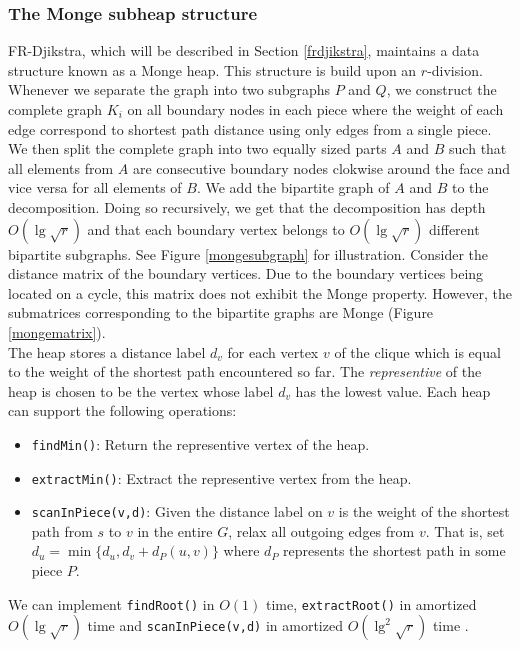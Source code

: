\subsubsection{The Monge subheap structure}\label{mongeheap}
FR-Djikstra, which will be described in Section \ref{frdjikstra}, maintains a data
structure known as a Monge heap. This structure is build upon an $r$-division. Whenever we separate the graph into two
subgraphs $P$ and $Q$, we construct the complete graph $K_i$ on all boundary nodes in
each piece where the weight of each edge correspond to shortest path distance using
only edges from a single piece. We then split the complete graph into two equally
sized parts $A$
and $B$ such that all elements from $A$ are consecutive boundary nodes clokwise around
the face and vice versa for all elements of $B$. We add the bipartite graph of $A$ and $B$ to
the decomposition. Doing so recursively, we get that the decomposition has depth $O(\lg
\sqrt{r})$ and that each boundary vertex belongs to $O(\lg \sqrt{r})$ different bipartite
subgraphs. See Figure \ref{mongesubgraph} for illustration. Consider the distance matrix
of the boundary vertices. Due to the boundary vertices being located on a cycle, this matrix
does not exhibit the Monge property. However, the submatrices corresponding to the
bipartite graphs are Monge (Figure \ref{mongematrix}). \\
The heap stores a distance label $d_v$ for each vertex $v$ of the
clique which is equal to the weight of the shortest path encountered so far. The
\textit{representive} of the heap is chosen to be the vertex whose label $d_v$ has the lowest
value. Each heap can support the following operations:
\begin{itemize}
  \item \texttt{findMin()}: Return the representive vertex of the heap.
  \item \texttt{extractMin()}: Extract the representive vertex from the heap.
  \item \texttt{scanInPiece(v,d)}: Given the distance label on $v$ is the weight of the
    shortest path from $s$ to $v$ in the entire $G$, relax all outgoing edges from $v$.
    That is, set $d_u=\min\{d_u, d_v+d_P(u,v)\}$ where $d_P$ represents the shortest path
    in some piece $P$.
\end{itemize}
We can implement \texttt{findRoot()} in $O(1)$ time, \texttt{extractRoot()} in amortized
$O(\lg \sqrt{r})$ time and \texttt{scanInPiece(v,d)} in amortized $O(\lg^2 \sqrt{r})$
time \cite{fakcharoenphol2006planar}.

